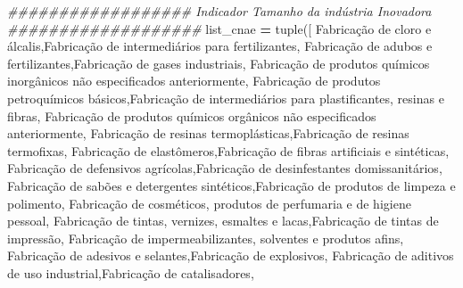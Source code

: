 \documentclass[
  12,
  dvipsnames]{article}
\newenvironment{Shaded}{\begin{snugshade}}{\end{snugshade}}
\newcommand{\BuiltInTok}[1]{#1}
\newcommand{\CommentTok}[1]{\textcolor[rgb]{0.56,0.35,0.01}{\textit{#1}}}
\newcommand{\NormalTok}[1]{#1}
\newcommand{\OperatorTok}[1]{\textcolor[rgb]{0.81,0.36,0.00}{\textbf{#1}}}
\newcommand{\StringTok}[1]{\textcolor[rgb]{0.31,0.60,0.02}{#1}}
\begin{document}
\begin{Shaded}
\begin{Highlighting}[]
\CommentTok{\#\#\#\#\#\#\#\#\#\#\#\#\#\#\#\#\#\# Indicador Tamanho da indústria Inovadora \#\#\#\#\#\#\#\#\#\#\#\#\#\#\#\#\#\#\#}
\NormalTok{list\_cnae }\OperatorTok{=} \BuiltInTok{tuple}\NormalTok{([}
    \StringTok{\textquotesingle{}Fabricação de cloro e álcalis\textquotesingle{}}\NormalTok{,}\StringTok{\textquotesingle{}Fabricação de intermediários para fertilizantes\textquotesingle{}}\NormalTok{,}
    \StringTok{\textquotesingle{}Fabricação de adubos e fertilizantes\textquotesingle{}}\NormalTok{,}\StringTok{\textquotesingle{}Fabricação de gases industriais\textquotesingle{}}\NormalTok{,}
    \StringTok{\textquotesingle{}Fabricação de produtos químicos inorgânicos não especificados anteriormente\textquotesingle{}}\NormalTok{,}
    \StringTok{\textquotesingle{}Fabricação de produtos petroquímicos básicos\textquotesingle{}}\NormalTok{,}\StringTok{\textquotesingle{}Fabricação de intermediários para plastificantes, resinas e fibras\textquotesingle{}}\NormalTok{,}
    \StringTok{\textquotesingle{}Fabricação de produtos químicos orgânicos não especificados anteriormente\textquotesingle{}}\NormalTok{,}
    \StringTok{\textquotesingle{}Fabricação de resinas termoplásticas\textquotesingle{}}\NormalTok{,}\StringTok{\textquotesingle{}Fabricação de resinas termofixas\textquotesingle{}}\NormalTok{,}
    \StringTok{\textquotesingle{}Fabricação de elastômeros\textquotesingle{}}\NormalTok{,}\StringTok{\textquotesingle{}Fabricação de fibras artificiais e sintéticas\textquotesingle{}}\NormalTok{,}
    \StringTok{\textquotesingle{}Fabricação de defensivos agrícolas\textquotesingle{}}\NormalTok{,}\StringTok{\textquotesingle{}Fabricação de desinfestantes domissanitários\textquotesingle{}}\NormalTok{,}
    \StringTok{\textquotesingle{}Fabricação de sabões e detergentes sintéticos\textquotesingle{}}\NormalTok{,}\StringTok{\textquotesingle{}Fabricação de produtos de limpeza e polimento\textquotesingle{}}\NormalTok{,}
    \StringTok{\textquotesingle{}Fabricação de cosméticos, produtos de perfumaria e de higiene pessoal\textquotesingle{}}\NormalTok{,}
    \StringTok{\textquotesingle{}Fabricação de tintas, vernizes, esmaltes e lacas\textquotesingle{}}\NormalTok{,}\StringTok{\textquotesingle{}Fabricação de tintas de impressão\textquotesingle{}}\NormalTok{,}
    \StringTok{\textquotesingle{}Fabricação de impermeabilizantes, solventes e produtos afins\textquotesingle{}}\NormalTok{,}
    \StringTok{\textquotesingle{}Fabricação de adesivos e selantes\textquotesingle{}}\NormalTok{,}\StringTok{\textquotesingle{}Fabricação de explosivos\textquotesingle{}}\NormalTok{,}
    \StringTok{\textquotesingle{}Fabricação de aditivos de uso industrial\textquotesingle{}}\NormalTok{,}\StringTok{\textquotesingle{}Fabricação de catalisadores\textquotesingle{}}\NormalTok{,}

\end{Highlighting}
\end{Shaded}
\end{document}
